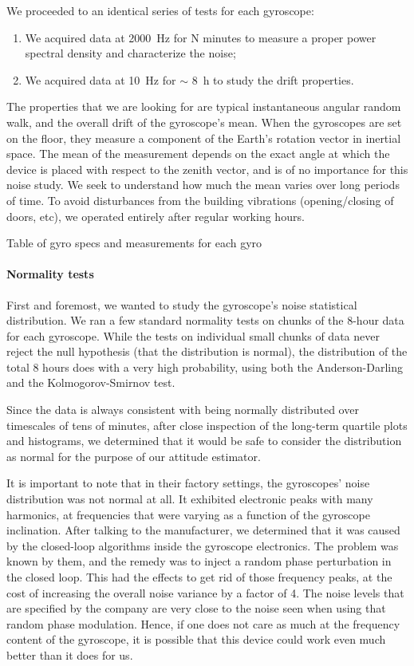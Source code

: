 We proceeded to an identical series of tests for each gyroscope:
\begin{enumerate}
\item We acquired data at \SI{2000}{\hertz} for N minutes to measure a proper power spectral density and characterize the noise;
\item We acquired data at \SI{10}{\hertz} for $\sim$ \SI{8}{\hour} to study the drift properties.
\end{enumerate}

The properties that we are looking for are typical instantaneous angular random walk, and the overall drift of the gyroscope's mean. When the gyroscopes are set on the floor, they measure a component of the Earth's rotation vector in inertial space. The mean of the measurement depends on the exact angle at which the device is placed with respect to the zenith vector, and is of no importance for this noise study. We seek to understand how much the mean varies over long periods of time. To avoid disturbances from the building vibrations (opening/closing of doors, etc), we operated entirely after regular working hours.

Table of gyro specs and measurements for each gyro

\paragraph{Normality tests}
First and foremost, we wanted to study the gyroscope's noise statistical distribution. We ran a few standard normality tests on chunks of the 8-hour data for each gyroscope. While the tests on individual small chunks of data never reject the null hypothesis (that the distribution is normal), the distribution of the total 8 hours does with a very high probability, using both the Anderson-Darling and the Kolmogorov-Smirnov test.

Since the data is always consistent with being normally distributed over timescales of tens of minutes, after close inspection of the long-term quartile plots and histograms, we determined that it would be safe to consider the distribution as normal for the purpose of our attitude estimator. 

It is important to note that in their factory settings, the gyroscopes' noise distribution was not normal at all. It exhibited electronic peaks with many harmonics, at frequencies that were varying as a function of the gyroscope inclination. After talking to the manufacturer, we determined that it was caused by the closed-loop algorithms inside the gyroscope electronics. The problem was known by them, and the remedy was to inject a random phase perturbation in the closed loop. This had the effects to get rid of those frequency peaks, at the cost of increasing the overall noise variance by a factor of 4. The noise levels that are specified by the company are very close to the noise seen when using that random phase modulation. Hence, if one does not care as much at the frequency content of the gyroscope, it is possible that this device could work even much better than it does for us.


